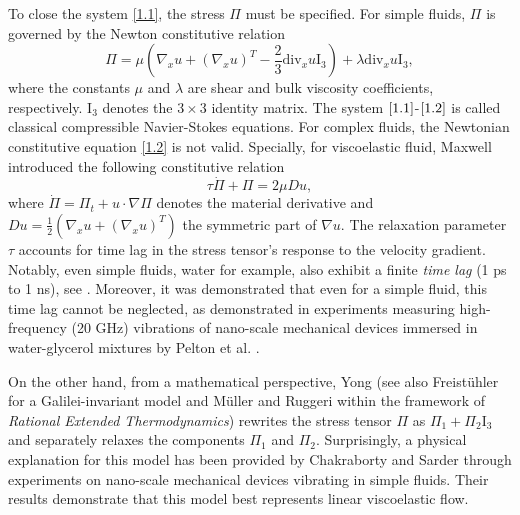 \documentclass[10pt,reqno]{amsart}
\numberwithin{equation}{section}
\newcommand{\ddiv}{\mathrm{div}}
\begin{document}
To close the system \eqref{1.1}, the stress $\Pi$ must be specified. For simple fluids, $\Pi$ is governed by the Newton constitutive relation
\begin{equation}\label{1.2}
\Pi=\mu\left(\nabla_x u+(\nabla_x u)^T-\frac{2}{3}\ddiv_x u \mathrm{I}_3\right)+\lambda\ddiv_x u\mathrm{I}_3,
\end{equation}
where the constants $\mu$ and $\lambda$ are shear and bulk viscosity coefficients, respectively. $\mathrm{I}_3$ denotes the $3\times 3$ identity matrix. The system $\eqref{1.1}$-$\eqref{1.2}$ is called classical compressible Navier-Stokes equations. For complex fluids, the Newtonian constitutive equation \eqref{1.2} is not valid.  Specially, for viscoelastic fluid, Maxwell \cite{MAX} introduced the following constitutive relation
\begin{equation}\nonumber
\tau\dot\Pi+\Pi=2\mu Du,
\end{equation}
 where $\dot\Pi=\Pi_t+u\cdot\nabla\Pi$ denotes the material derivative and $D u=\frac{1}{2}\left(\nabla_x u+(\nabla_x u)^T\right)$ the symmetric part of $\nabla u$. The relaxation parameter $\tau$ accounts for time lag in the stress tensor's response to the velocity gradient. Notably, even simple fluids, water for example, also exhibit a finite {\it time lag} (1 ps to 1 ns), see \cite{GM, FS}. Moreover, it was demonstrated that even for a simple fluid, this time lag cannot be neglected, as demonstrated in experiments measuring high-frequency (20 GHz) vibrations of nano-scale mechanical devices immersed in water-glycerol mixtures by Pelton et al. \cite{MP}.


On the other hand, from a mathematical perspective, Yong \cite{YWA} (see also Freist\"uhler \cite{FRE1, FRE2} for a Galilei-invariant model and M\"uller and Ruggeri\cite{muller1998}  within the framework of {\it{Rational Extended  Thermodynamics}}) rewrites the stress tensor $\Pi$ as $\Pi_1 + \Pi_2 \mathrm{I}_3$ and separately relaxes the components $\Pi_1$ and $\Pi_2$. Surprisingly, a physical explanation for this model has been provided by Chakraborty and Sarder \cite{DJE} through experiments on nano-scale mechanical devices vibrating in simple fluids. Their results demonstrate that this model best represents linear viscoelastic flow.
\end{document}
